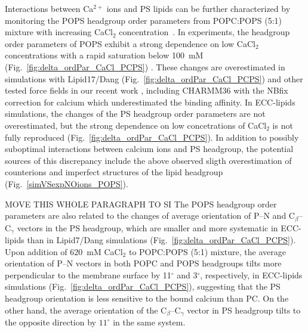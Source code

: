 \documentclass[journal=jpcbfk,manuscript=article]{achemso}
\begin{document}
Interactions between Ca$^{2+}$ ions and PS lipids can be further characterized by monitoring
the POPS headgroup order parameters from POPC:POPS (5:1) mixture with increasing  CaCl$_2$ concentration~\cite{roux90}.
In experiments, the headgroup order parameters of POPS exhibit a strong dependence
on low CaCl$_2$ concentrations with a rapid saturation below 100~mM  (Fig.~\ref{fig:delta_ordPar_CaCl_PCPS}) \cite{roux90}.
These changes are overestimated in simulations with Lipid17/Dang (Fig.~\ref{fig:delta_ordPar_CaCl_PCPS})
and other tested force fields in our recent work \cite{NMRlipidsIV}, 
including CHARMM36 with the NBfix correction for calcium
which underestimated the binding affinity.
In ECC-lipids simulations, the changes of the PS headgroup order parameters are not overestimated,
but the strong dependence on low concetrations of CaCl$_2$ is not fully reproduced (Fig.~\ref{fig:delta_ordPar_CaCl_PCPS}).
In addition to possibly suboptimal interactions between calcium ions and PS headgroup, the potential sources of this
discrepancy include the above observed sligth overestimation of  counterions and
imperfect structures of the lipid headgroup (Fig.~\ref{simVSexpNOions_POPS}).

MOVE THIS WHOLE PARAGRAPH TO SI
The POPS headgroup order parameters are also related to the changes of average orientation of P--N and
C$_{\beta}$--C$_{\gamma}$ vectors in the PS headgroup, which are smaller and more systematic
in ECC-lipids than in Lipid7/Dang simulations (Fig.~\ref{fig:delta_ordPar_CaCl_PCPS}).
Upon addition of 620~mM CaCl$_2$ to POPC:POPS (5:1) mixture,
the average orientation of P--N vectors in both POPC and POPS headgroups tilts more perpendicular to the membrane surface
by 11$^\circ$ and  3$^\circ$, respectively, in ECC-lipids simulations (Fig.~\ref{fig:delta_ordPar_CaCl_PCPS}),
suggesting that the PS headgroup orientation is less sensitive to the bound calcium than PC.
On the other hand, the average orientation of the C$_{\beta}$--C$_{\gamma}$ vector in PS headgroup
tilts to the opposite direction by $11^\circ$ in the same system.
\end{document}
